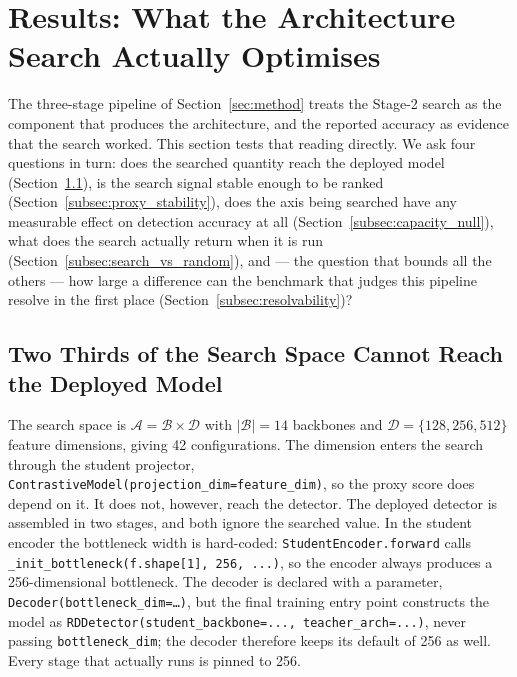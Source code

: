 
\section{Results: What the Architecture Search Actually Optimises}
\label{sec:diagnosis}

The three-stage pipeline of Section~\ref{sec:method} treats the Stage-2 search as
the component that produces the architecture, and the reported accuracy as
evidence that the search worked. This section tests that reading directly. We ask
four questions in turn: does the searched quantity reach the deployed model
(Section~\ref{subsec:inert}), is the search signal stable enough to be ranked
(Section~\ref{subsec:proxy_stability}), does the axis being searched have any
measurable effect on detection accuracy at all (Section~\ref{subsec:capacity_null}),
what does the search actually return when it is run
(Section~\ref{subsec:search_vs_random}), and --- the question that bounds all the
others --- how large a difference can the benchmark that judges this pipeline
resolve in the first place (Section~\ref{subsec:resolvability})?

\subsection{Two Thirds of the Search Space Cannot Reach the Deployed Model}
\label{subsec:inert}

The search space is
$\mathcal{A} = \mathcal{B} \times \mathcal{D}$ with
$|\mathcal{B}| = 14$ backbones and
$\mathcal{D} = \{128, 256, 512\}$ feature dimensions, giving 42 configurations.
The dimension enters the search through the student projector,
\texttt{ContrastiveModel(\allowbreak projection\_dim=\allowbreak feature\_dim)}, so the proxy score does
depend on it. It does not, however, reach the detector. The deployed detector is
assembled in two stages, and both ignore the searched value. In the student
encoder the bottleneck width is hard-coded: \texttt{StudentEncoder.forward}
calls \texttt{\_init\_bottleneck(f.shape[1], 256, ...)}, so the encoder always
produces a 256-dimensional bottleneck. The decoder is declared with a parameter,
\texttt{Decoder(bottleneck\_dim=\dots)}, but the final training entry point
constructs the model as
\texttt{RDDetector(student\_backbone=..., teacher\_arch=...)}, never passing
\texttt{bottleneck\_dim}; the decoder therefore keeps its default of 256 as well.
Every stage that actually runs is pinned to 256.

